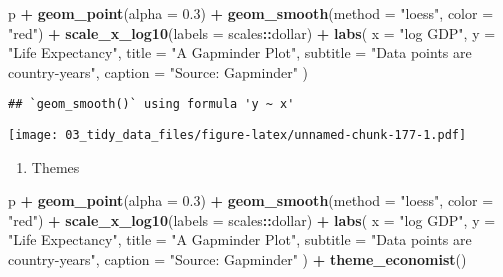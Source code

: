 \documentclass[
]{book}
\newenvironment{Shaded}{\begin{snugshade}}{\end{snugshade}}
\newcommand{\DataTypeTok}[1]{\textcolor[rgb]{0.13,0.29,0.53}{#1}}
\newcommand{\FloatTok}[1]{\textcolor[rgb]{0.00,0.00,0.81}{#1}}
\newcommand{\KeywordTok}[1]{\textcolor[rgb]{0.13,0.29,0.53}{\textbf{#1}}}
\newcommand{\NormalTok}[1]{#1}
\newcommand{\OperatorTok}[1]{\textcolor[rgb]{0.81,0.36,0.00}{\textbf{#1}}}
\newcommand{\StringTok}[1]{\textcolor[rgb]{0.31,0.60,0.02}{#1}}
\providecommand{\tightlist}{%
  \setlength{\itemsep}{0pt}\setlength{\parskip}{0pt}}
\begin{document}
\begin{Shaded}
\begin{Highlighting}[]
\NormalTok{p }\OperatorTok{+}\StringTok{ }\KeywordTok{geom\_point}\NormalTok{(}\DataTypeTok{alpha =} \FloatTok{0.3}\NormalTok{) }\OperatorTok{+}
\StringTok{  }\KeywordTok{geom\_smooth}\NormalTok{(}\DataTypeTok{method =} \StringTok{"loess"}\NormalTok{, }\DataTypeTok{color =} \StringTok{"red"}\NormalTok{) }\OperatorTok{+}
\StringTok{  }\KeywordTok{scale\_x\_log10}\NormalTok{(}\DataTypeTok{labels =}\NormalTok{ scales}\OperatorTok{::}\NormalTok{dollar) }\OperatorTok{+}
\StringTok{  }\KeywordTok{labs}\NormalTok{(}
    \DataTypeTok{x =} \StringTok{"log GDP"}\NormalTok{,}
    \DataTypeTok{y =} \StringTok{"Life Expectancy"}\NormalTok{,}
    \DataTypeTok{title =} \StringTok{"A Gapminder Plot"}\NormalTok{,}
    \DataTypeTok{subtitle =} \StringTok{"Data points are country{-}years"}\NormalTok{,}
    \DataTypeTok{caption =} \StringTok{"Source: Gapminder"}
\NormalTok{  )}
\end{Highlighting}
\end{Shaded}

\begin{verbatim}
## `geom_smooth()` using formula 'y ~ x'
\end{verbatim}

\texttt{[image: 03\_tidy\_data\_files/figure-latex/unnamed-chunk-177-1.pdf]}

\begin{enumerate}
\def\labelenumi{\arabic{enumi}.}
\setcounter{enumi}{5}
\tightlist
\item
  Themes
\end{enumerate}

\begin{Shaded}
\begin{Highlighting}[]
\NormalTok{p }\OperatorTok{+}\StringTok{ }\KeywordTok{geom\_point}\NormalTok{(}\DataTypeTok{alpha =} \FloatTok{0.3}\NormalTok{) }\OperatorTok{+}
\StringTok{  }\KeywordTok{geom\_smooth}\NormalTok{(}\DataTypeTok{method =} \StringTok{"loess"}\NormalTok{, }\DataTypeTok{color =} \StringTok{"red"}\NormalTok{) }\OperatorTok{+}
\StringTok{  }\KeywordTok{scale\_x\_log10}\NormalTok{(}\DataTypeTok{labels =}\NormalTok{ scales}\OperatorTok{::}\NormalTok{dollar) }\OperatorTok{+}
\StringTok{  }\KeywordTok{labs}\NormalTok{(}
    \DataTypeTok{x =} \StringTok{"log GDP"}\NormalTok{,}
    \DataTypeTok{y =} \StringTok{"Life Expectancy"}\NormalTok{,}
    \DataTypeTok{title =} \StringTok{"A Gapminder Plot"}\NormalTok{,}
    \DataTypeTok{subtitle =} \StringTok{"Data points are country{-}years"}\NormalTok{,}
    \DataTypeTok{caption =} \StringTok{"Source: Gapminder"}
\NormalTok{  ) }\OperatorTok{+}
\StringTok{  }\KeywordTok{theme\_economist}\NormalTok{()}
\end{Highlighting}
\end{Shaded}
\end{document}
